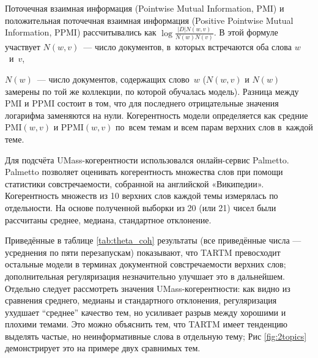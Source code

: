  

Поточечная взаимная информация (Pointwise Mutual Information, PMI) и положительная поточечная взаимная информация (Positive Pointwise Mutual Information, PPMI) рассчитывались как $\log\frac{|D| N(w,v)}{N(w)N(v)}$. В этой формуле участвует $N(w,v)$~--- число документов, в~которых встречаются оба слова $w$~и~$v$, 

$N(w)$~--- число документов, содержащих слово~$w$ ($N(w,v)$ и $N(w)$ замерены по той же коллекции, по которой обучалась модель). Разница между PMI и PPMI состоит в том, что для последнего отрицательные значения логарифма заменяются на нули. Когерентность модели определяется как средние $\mathrm{PMI}(w,v)$ и $\mathrm{PPMI}(w,v)$ по~всем темам и всем парам верхних слов в~каждой теме. 

 

Для подсчёта UMass-когерентности использовался онлайн-сервис Palmetto. Palmetto позволяет оценивать когерентность множества слов при помощи статистики совстречаемости, собранной на английской «Википедии». Когерентность множеств из 10 верхних слов каждой темы измерялась по отдельности. На основе полученной выборки из 20 (или 21) чисел были рассчитаны среднее, медиана, стандартное отклонение. 

 

Приведённые в таблице \ref{tab:theta_coh} результаты (все приведённые числа --- усреднения по пяти перезапускам) показывают, что TARTM превосходит остальные модели в терминах документной совстречаемости верхних слов; дополнительная регуляризация незначительно улучшает это в дальнейшем. Отдельно следует рассмотреть значения UMass-когерентности: как видно из сравнения среднего, медианы и стандартного отклонения, регуляризация ухудшает ``среднее'' качество тем, но усиливает разрыв между хорошими и плохими темами. Это можно объяснить тем, что TARTM имеет тенденцию выделять частые, но неинформативные слова в отдельную тему; Рис \ref{fig:2topics} демонстрирует это на примере двух сравнимых тем. 

 

